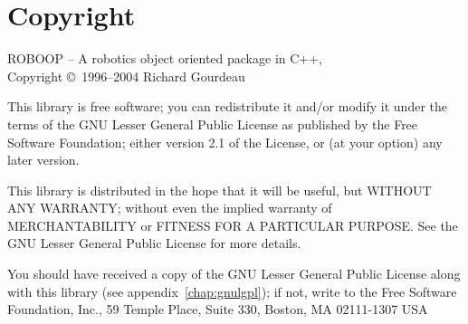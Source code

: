 \section{Copyright}

ROBOOP -- A robotics object oriented package in C++, \\
Copyright \copyright\ 1996--2004  Richard Gourdeau


This library is free software; you can redistribute it and/or
modify it under the terms of the GNU Lesser General Public
License as published by the Free Software Foundation; either
version 2.1 of the License, or (at your option) any later version.

This library is distributed in the hope that it will be useful,
but WITHOUT ANY WARRANTY; without even the implied warranty of
MERCHANTABILITY or FITNESS FOR A PARTICULAR PURPOSE.  See the GNU
Lesser General Public License for more details.

You should have received a copy of the GNU Lesser General Public
License along with this library (see appendix~\ref{chap:gnulgpl}); if
not, write to the Free Software Foundation, Inc., 59 Temple Place,
Suite 330, Boston, MA 02111-1307 USA


